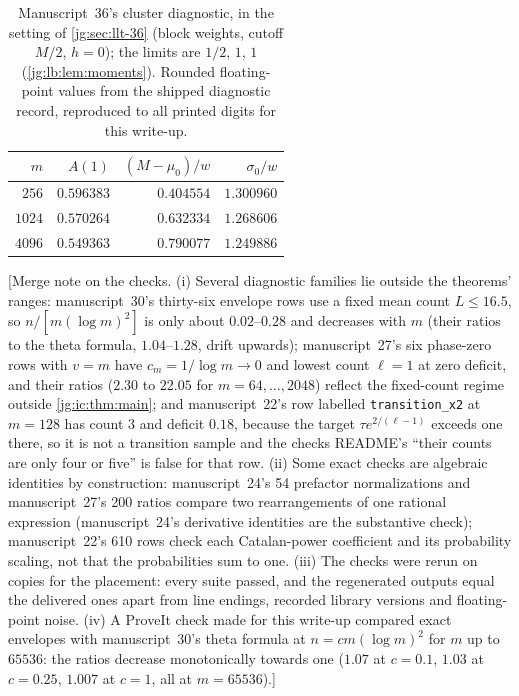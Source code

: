\documentclass[11pt,a4paper]{article}
\theoremstyle{definition}\newaliascnt{definition}{theorem}
\theoremstyle{remark}\newaliascnt{remark}{theorem}
\begin{document}
\begin{table}[htbp]
\centering
\begin{tabular}{rrrr}
\toprule
$m$ & $A(1)$ & $(M-\mu_0)/w$ & $\sigma_0/w$\\
\midrule
$256$  & $0.596383$ & $0.404554$ & $1.300960$\\
$1024$ & $0.570264$ & $0.632334$ & $1.268606$\\
$4096$ & $0.549363$ & $0.790077$ & $1.249886$\\
\bottomrule
\end{tabular}
\caption{Manuscript~36's cluster diagnostic, in the setting of
\cref{jg:sec:llt-36} (block weights, cutoff $M/2$, $h=0$); the limits are
$1/2$, $1$, $1$ (\cref{jg:lb:lem:moments}). Rounded floating-point values
from the shipped diagnostic record, reproduced to all printed digits for this
write-up.}\label{jg:tab:lb-diag}
\end{table}

[Merge note on the checks. (i) Several diagnostic families lie outside the
theorems' ranges: manuscript~30's thirty-six envelope rows use a fixed mean
count $L\le16.5$, so $n/[m(\log m)^2]$ is only about $0.02$--$0.28$ and
decreases with $m$ (their ratios to the theta formula, $1.04$--$1.28$, drift
upwards); manuscript~27's six phase-zero rows with $v=m$ have
$c_m=1/\log m\to0$ and lowest count $\ell=1$ at zero deficit, and their ratios
($2.30$ to $22.05$ for $m=64,\ldots,2048$) reflect the fixed-count regime outside
\cref{jg:ic:thm:main}; and manuscript~22's row labelled
\texttt{transition\_x2} at $m=128$ has count $3$ and deficit $0.18$, because the
target $\tau e^{2/(\ell-1)}$ exceeds one there, so it is not a transition sample
and the checks README's ``their counts are only four or five'' is false for
that row. (ii) Some exact checks are algebraic identities by construction:
manuscript~24's 54 prefactor normalizations and manuscript~27's 200 ratios
compare two rearrangements of one rational expression (manuscript~24's
derivative identities are the substantive check); manuscript~22's 610 rows check
each Catalan-power coefficient and its probability scaling, not that the
probabilities sum to one. (iii) The checks were rerun on copies for the
placement: every suite passed, and the regenerated outputs equal the delivered
ones apart from line endings, recorded library versions and floating-point
noise. (iv) A ProveIt check made for this write-up compared exact envelopes with
manuscript~30's theta formula at $n=cm(\log m)^2$ for $m$ up to $65536$: the
ratios decrease monotonically towards one ($1.07$ at $c=0.1$, $1.03$ at
$c=0.25$, $1.007$ at $c=1$, all at $m=65536$).]
\end{document}

